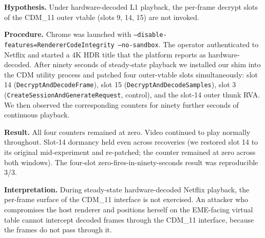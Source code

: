 \documentclass[11pt,letterpaper]{article}
\begin{document}
\textbf{Hypothesis.} Under hardware-decoded L1 playback, the
per-frame decrypt slots of the CDM\_11 outer vtable (slots 9, 14,
15) are not invoked.

\textbf{Procedure.} Chrome was launched with
\texttt{--disable-features=RendererCodeIntegrity --no-sandbox}. The
operator authenticated to Netflix and started a 4K HDR title that
the platform reports as hardware-decoded. After ninety seconds of
steady-state playback we installed our shim into the CDM utility
process and patched four outer-vtable slots simultaneously: slot 14
(\texttt{DecryptAndDecodeFrame}), slot 15
(\texttt{DecryptAndDecodeSamples}), slot 3
(\texttt{CreateSessionAndGenerateRequest}, control), and the
slot-14 outer thunk RVA. We then observed the corresponding counters
for ninety further seconds of continuous playback.

\textbf{Result.} All four counters remained at zero. Video continued
to play normally throughout. Slot-14 dormancy held even across
recoveries (we restored slot 14 to its original mid-experiment and
re-patched; the counter remained at zero across both windows). The
four-slot zero-fires-in-ninety-seconds result was reproducible
3/3.

\textbf{Interpretation.} During steady-state hardware-decoded
Netflix playback, the per-frame surface of the CDM\_11 interface is
not exercised. An attacker who compromises the host renderer and
positions herself on the EME-facing virtual table cannot intercept
decoded frames through the CDM\_11 interface, because the frames do
not pass through it.
\end{document}
